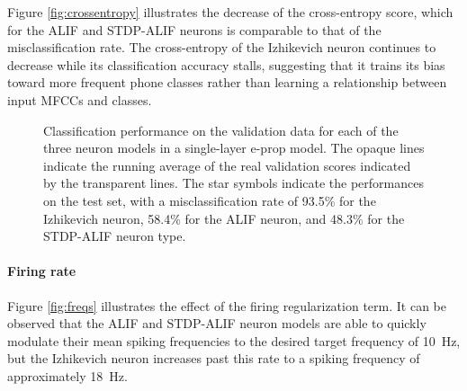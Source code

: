 		Figure \ref{fig:crossentropy} illustrates the decrease of the cross-entropy score, which for the ALIF and STDP-ALIF neurons is comparable to that of the misclassification rate.
		The cross-entropy of the Izhikevich neuron continues to decrease while its classification accuracy stalls, suggesting that it trains its bias toward more frequent phone classes rather than learning a relationship between input MFCCs and classes.

		\begin{figure}[bth]
		    \myfloatalign
		     \quad
		    \caption[Single-layer classification performance per neuron model]{Classification performance on the validation data for each of the three neuron models in a single-layer e-prop model. The opaque lines indicate the running average of the real validation scores indicated by the transparent lines. The star symbols indicate the performances on the test set, with a misclassification rate of 93.5\% for the Izhikevich neuron, 58.4\% for the ALIF neuron, and 48.3\% for the STDP-ALIF neuron type.}\label{fig:sl-acc}
		\end{figure}

	\paragraph{Firing rate}
		Figure \ref{fig:freqs} illustrates the effect of the firing regularization term.
		It can be observed that the ALIF and STDP-ALIF neuron models are able to quickly modulate their mean spiking frequencies to the desired target frequency of \SI{10}{\Hz}, but the Izhikevich neuron increases past this rate to a spiking frequency of approximately \SI{18}{\Hz}.

